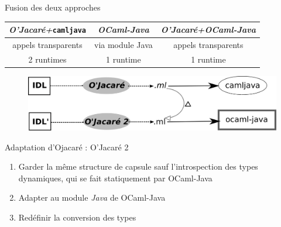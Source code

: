 \documentclass[xcolor={table,dvipsnames}]{beamer}
\newcommand{\camljava}{{\tt{camljava}}}
\begin{document}
\begin{frame}{Fusion des deux approches}

\begin{tabular}{|c|c@{\,\vrule width 6pt\,}c|}
  \hline
   \cellcolor[gray]{0.6}\emph{O'Jacaré+}\camljava & \cellcolor[gray]{0.6}\emph{OCaml-Java}& \cellcolor[gray]{0.6} \emph{O'Jacaré+OCaml-Java}\\
  \hline\hline
 \cellcolor[gray]{0.8} appels transparents & via module Java & \cellcolor[gray]{0.8}appels transparents\\
\hline
  2 runtimes &\cellcolor[gray]{0.8} 1 runtime&\cellcolor[gray]{0.8} 1 runtime \\
\hline
\end{tabular}

\bigskip 

\begin{figure}[h]
  \centering
  \includegraphics[scale=1]{schema1.png}
\end{figure}

\end{frame}



\begin{frame}{Adaptation d'Ojacaré : O'Jacaré 2}

\begin{enumerate}
\item Garder la même structure de capsule sauf l'introspection des
  types dynamiques, qui se fait statiquement par OCaml-Java

\item Adapter au module \emph{Java} de OCaml-Java

\item Redéfinir la conversion des types

\begin{figure}
\end{figure}

\end{enumerate}
\end{frame}
\end{document}
